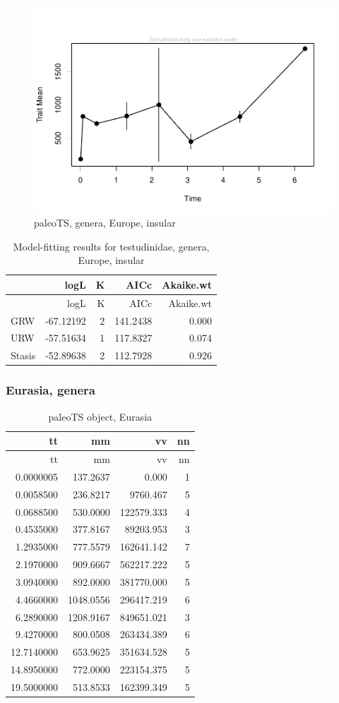 \begin{figure}[H]
	\centering
	\includegraphics{MA_JJ_files/figure-latex/pTSEuI-1.pdf}
	\caption{paleoTS, genera, Europe, insular}
	\label{fig:pTSEuI}
\end{figure}

\begin{longtable}[]{@{}lrrrr@{}}
	\caption{Model-fitting results for testudinidae, genera, Europe,
		insular}
	\label{tab:pTSEuIEM}\tabularnewline
	\toprule
	& logL & K & AICc & Akaike.wt\tabularnewline
	\midrule
	\endfirsthead
	\toprule
	& logL & K & AICc & Akaike.wt\tabularnewline
	\midrule
	\endhead
	GRW & -67.12192 & 2 & 141.2438 & 0.000\tabularnewline
	URW & -57.51634 & 1 & 117.8327 & 0.074\tabularnewline
	Stasis & -52.89638 & 2 & 112.7928 & 0.926\tabularnewline
	\bottomrule
\end{longtable}

\FloatBarrier


\subsubsection{Eurasia,	genera}\label{eurasia-genera}

\begin{longtable}[]{@{}rrrr@{}}
	\caption{paleoTS object, Eurasia}
	\label{tab:pTSEs}\tabularnewline
	\toprule
	tt & mm & vv & nn\tabularnewline
	\midrule
	\endfirsthead
	\toprule
	tt & mm & vv & nn\tabularnewline
	\midrule
	\endhead
	0.0000005 & 137.2637 & 0.000 & 1\tabularnewline
	0.0058500 & 236.8217 & 9760.467 & 5\tabularnewline
	0.0688500 & 530.0000 & 122579.333 & 4\tabularnewline
	0.4535000 & 377.8167 & 89203.953 & 3\tabularnewline
	1.2935000 & 777.5579 & 162641.142 & 7\tabularnewline
	2.1970000 & 909.6667 & 562217.222 & 5\tabularnewline
	3.0940000 & 892.0000 & 381770.000 & 5\tabularnewline
	4.4660000 & 1048.0556 & 296417.219 & 6\tabularnewline
	6.2890000 & 1208.9167 & 849651.021 & 3\tabularnewline
	9.4270000 & 800.0508 & 263434.389 & 6\tabularnewline
	12.7140000 & 653.9625 & 351634.528 & 5\tabularnewline
	14.8950000 & 772.0000 & 223154.375 & 5\tabularnewline
	19.5000000 & 513.8533 & 162399.349 & 5\tabularnewline
	\bottomrule
\end{longtable}

